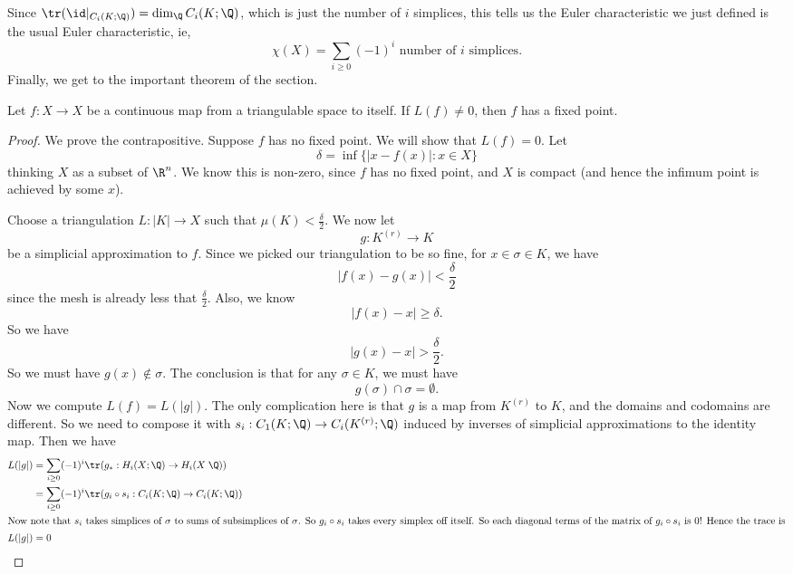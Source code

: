 \documentclass[a4paper]{article}
\begin{document}
Since $\tr (\id|_{C_i(K; \Q)}) = \dim_\Q C_i(K; \Q)$, which is just the number of $i$ simplices, this tells us the Euler characteristic we just defined is the usual Euler characteristic, ie,
\[
  \chi(X) = \sum_{i \geq 0} (-1)^i \text{ number of $i$ simplices}.
\]
Finally, we get to the important theorem of the section.
\begin{thm}
  Let $f: X \to X$ be a continuous map from a triangulable space to itself. If $L(f) \not= 0$, then $f$ has a fixed point.
\end{thm}

\begin{proof}
  We prove the contrapositive. Suppose $f$ has no fixed point. We will show that $L(f) = 0$. Let
  \[
    \delta = \inf \{ |x - f(x)|: x \in X\}
  \]
  thinking $X$ as a subset of $\R^n$. We know this is non-zero, since $f$ has no fixed point, and $X$ is compact (and hence the infimum point is achieved by some $x$).

  Choose a triangulation $L: |K| \to X$ such that $\mu(K) < \frac{\delta}{2}$. We now let
  \[
    g: K^{(r)} \to K
  \]
  be a simplicial approximation to $f$. Since we picked our triangulation to be so fine, for $x \in \sigma \in K$, we have
  \[
    |f(x) - g(x)| < \frac{\delta}{2}
  \]
  since the mesh is already less that $\frac{\delta}{2}$. Also, we know
  \[
    |f(x) - x| \geq \delta.
  \]
  So we have
  \[
    |g(x) - x| > \frac{\delta}{2}.
  \]
  So we must have $g(x) \not\in \sigma$. The conclusion is that for any $\sigma \in K$, we must have
  \[
    g(\sigma) \cap \sigma = \emptyset.
  \]
  Now we compute $L(f) = L(|g|)$. The only complication here is that $g$ is a map from $K^{(r)}$ to $K$, and the domains and codomains are different. So we need to compose it with $s_i: C_1(K; \Q) \to C_i(K^{(r)}; \Q)$ induced by inverses of simplicial approximations to the identity map. Then we have
  \begin{align*}
    L(|g|) &= \sum_{i \geq 0} (-1)^i \tr(g_*: H_i(X; \Q) \to H_i(X\; \Q))\\
    &= \sum_{i \geq 0} (-1)^i \tr(g_i \circ s_i: C_i(K; \Q) \to C_i(K; \Q))\\
    \intertext{Now note that $s_i$ takes simplices of $\sigma$ to sums of subsimplices of $\sigma$. So $g_i \circ s_i$ takes every simplex off itself. So each diagonal terms of the matrix of $g_i \circ s_i$ is $0$! Hence the trace is}
    L(|g|) &= 0
  \end{align*}
\end{proof}
\end{document}
